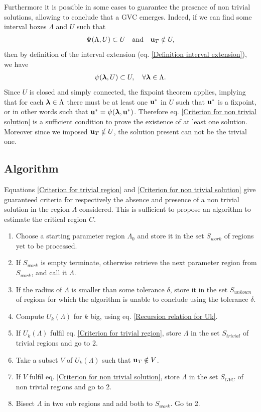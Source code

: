 \documentclass[
11pt, %
english, %
singlespacing, %
liststotoc, %
headsepline, %
]{MastersDoctoralThesis} %
\begin{document}
Furthermore it is possible in some cases to guarantee the presence of non trivial solutions, allowing to conclude that a GVC emerges. Indeed, if we can find some interval boxes $\Lambda$ and $U$ such that
\begin{align}
	\Psi(\Lambda, U) \subset U \quad \text{and} \quad \boldsymbol{\mathrm{u}}_T \notin U, \label{Criterion for non trivial solution}
\end{align}
then by definition of the interval extension (eq. \eqref{Definition interval extension}), we have
\begin{align}
	\psi(\boldsymbol{\mathrm{\lambda}}, U) \subset U, \quad \forall \boldsymbol{\mathrm{\lambda}} \in \Lambda.
\end{align}
Since $U$ is closed and simply connected, the fixpoint theorem \missingref{} applies, implying that for each $\boldsymbol{\mathrm{\lambda}} \in \Lambda$ there must be at least one $\boldsymbol{\mathrm{u}}^*$ in $U$ such that $\boldsymbol{\mathrm{u}}^*$ is a fixpoint, or in other words such that $\boldsymbol{\mathrm{u}}^* = \psi(\boldsymbol{\mathrm{\lambda}}, \boldsymbol{\mathrm{u}}^*)$. Therefore eq. \eqref{Criterion for non trivial solution} is a sufficient condition to prove the existence of at least one solution. Moreover since we imposed $\boldsymbol{\mathrm{u}}_T \notin U$, the solution present can not be the trivial one.

\subsection{Algorithm}

Equations \eqref{Criterion for trivial region} and \eqref{Criterion for non trivial solution} give guaranteed criteria for respectively the absence and presence of a non trivial solution in the region $\Lambda$ considered. This is sufficient to propose an algorithm to estimate the critical region $C$.

\begin{enumerate}
	\item Choose a starting parameter region $\Lambda_0$ and store it in the set $S_{work}$ of regions yet to be processed.
	\item If $S_{work}$ is empty terminate, otherwise retrieve the next parameter region from $S_{work}$, and call it $\Lambda$.
	\item If the radius of $\Lambda$ is smaller than some tolerance $\delta$, store it in the set $S_{unkown}$ of regions for which the algorithm is unable to conclude using the tolerance $\delta$.
	\item Compute $U_k(\Lambda)$ for $k$ big, using eq. \eqref{Recursion relation for Uk}.
	\item If $U_k(\Lambda)$ fulfil eq. \eqref{Criterion for trivial region}, store $\Lambda$ in the set $S_{trivial}$ of trivial regions and go to 2.
	\item Take a subset $V$ of $U_k(\Lambda)$ such that $\boldsymbol{\mathrm{u}}_T \notin V$.
	\item If $V$ fulfil eq. \eqref{Criterion for non trivial solution}, store $\Lambda$ in the set $S_{GVC}$ of non trivial regions and go to 2.
	\item Bisect $\Lambda$ in two sub regions and add both to $S_{work}$. Go to 2.
\end{enumerate}
\end{document}
